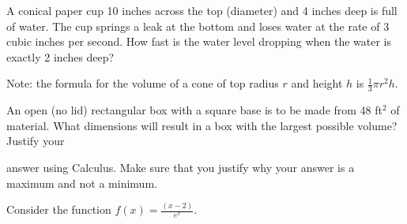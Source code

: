 \documentclass[addpoints,12pt]{exam}
\begin{document}
\begin{questions}
\newpage

\question[8] A conical paper cup 10 inches across the top (diameter) and 4 inches deep is full of
water. The cup springs a leak at the bottom and loses water at the rate of 3 cubic inches per
second. How fast is the water level dropping when the water is exactly 2 inches deep?

\bigskip

\noindent Note: the formula for the volume of a cone of top radius $r$ and height $h$ is
$\frac{1}{3}\pi r^2 h.$


\newpage


\question[8] An open (no lid) rectangular box with a square base is to be made from 48 ft$^2$ of
material. What dimensions will result in a box with the largest possible volume? Justify your

answer using Calculus. Make sure that you justify why your answer is a maximum and not a
minimum.

\newpage




\question Consider the function $f(x)=\frac{(x-2)}{e^{x}} $.

\end{questions}
\end{document}
